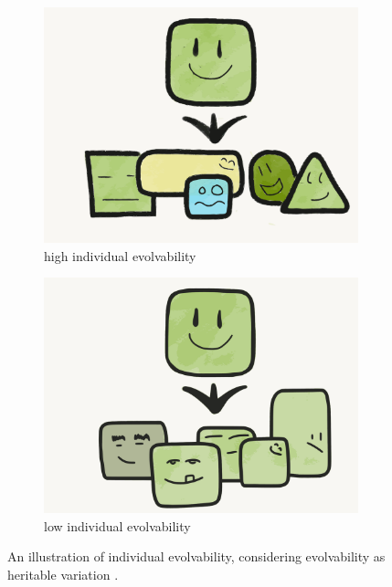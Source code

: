 \begin{figure}
 \centering
    \begin{subfigure}[b]{0.45\textwidth}
        \centering
    	\includegraphics[width=\textwidth]{img/individual_evolvability}
        \caption{high individual evolvability}
        \label{subfig:high_individual_evolvability}
    \end{subfigure}%
    \hfill
    \begin{subfigure}[b]{0.45\textwidth}
        \centering
        \includegraphics[width=\textwidth]{img/low_individual_evolvability}
        \caption{low individual evolvability}
        \label{subfig:low_individual_evolvability}
    \end{subfigure}
  \captionsetup{singlelinecheck=off,justification=raggedright}
  \caption[Cartoon Illustration of Individual Evolvability]{An illustration of individual evolvability, considering evolvability as heritable variation \cite{Wilder2015ReconcilingEvolvability}.}
  \label{fig:high_vs_low_individual_evolvability}
\end{figure}
